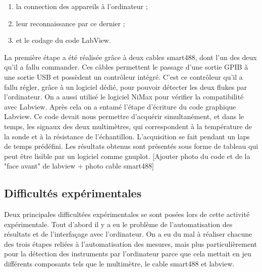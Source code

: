 \begin{enumerate}
\item la connection des appareils à l'ordinateur ; 
\item leur reconnaissance par ce dernier ; 
\item et le codage du code LabView. 
\end{enumerate}

La première étape a été réalisée grâce à deux cables smart488, dont l'un des deux qu'il a fallu commander. 
Ces câbles permettent le passage d'une sortie GPIB à une sortie USB et possèdent un contrôleur intégré. 
C'est ce contrôleur qu'il a fallu régler, grâce à un logiciel dédié, pour pouvoir détecter les deux flukes 
par l'ordinateur. On a aussi utilisé le logiciel NiMax pour vérifier la compatibilité avec Labview. 
Après cela on a entamé l'étape d'écriture du code graphique Labview. Ce code devait nous permettre d'acquérir 
simultanément, et dans le temps, les signaux des deux multimètres, qui correspondent à la température de la sonde 
et à la résistance de l'échantillon. L'acquisition se fait pendant un laps de temps prédéfini. Les résultats obtenus sont présentés sous forme de tableau qui peut être lisible par un logiciel comme gnuplot.
[Ajouter photo du code et de la "face avant" de labview + photo cable smart488]


\subsection{Difficultés expérimentales}
Deux principales difficultées expérimentales se sont posées lors de cette activité expérimentale. 
Tout d'abord il y a eu le problème de l'automatisation des résultats et de l'interfaçage avec l'ordinateur.
On a eu du mal à réaliser chacune des trois étapes reliées à l'automatisation des mesures, mais plus particulièrement 
pour la détection des instruments par l'ordinateur parce que cela mettait en jeu différents composants tels que le 
multimètre, le cable smart488 et labview.

